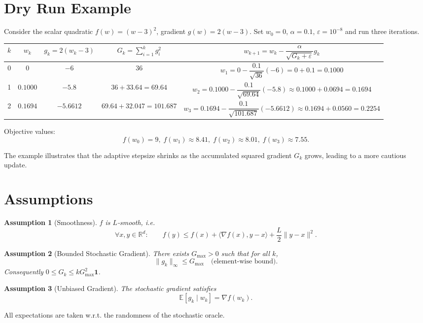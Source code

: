 \documentclass[11pt]{article}
\newtheorem{assumption}{Assumption}
\newcommand{\E}{\mathbb{E}}
\newcommand{\R}{\mathbb{R}}
\begin{document}
\section*{Dry Run Example}
Consider the scalar quadratic $f(w)=(w-3)^{2}$, gradient $g(w)=2(w-3)$.
Set $w_{0}=0$, $\alpha=0.1$, $\varepsilon=10^{-8}$ and run three iterations.

\begin{center}
\begin{tabular}{c|c|c|c|c}
$k$ & $w_{k}$ & $g_{k}=2(w_{k}-3)$ & $G_{k}=\sum_{i=1}^{k}g_{i}^{2}$ & $w_{k+1}=w_{k}-\dfrac{\alpha}{\sqrt{G_{k}+\varepsilon}}g_{k}$\\\hline
0 & $0$ & $-6$ & $36$ &
$w_{1}=0-\dfrac{0.1}{\sqrt{36}}(-6)=0+0.1=0.1000$\\[4pt]
1 & $0.1000$ & $-5.8$ & $36+33.64=69.64$ &
$w_{2}=0.1000-\dfrac{0.1}{\sqrt{69.64}}(-5.8)
          \approx0.1000+0.0694=0.1694$\\[4pt]
2 & $0.1694$ & $-5.6612$ &
$69.64+32.047=101.687$ &
$w_{3}=0.1694-\dfrac{0.1}{\sqrt{101.687}}(-5.6612)
          \approx0.1694+0.0560=0.2254$
\end{tabular}
\end{center}
Objective values:
\[
f(w_{0})=9,\; f(w_{1})\approx8.41,\; f(w_{2})\approx8.01,\; f(w_{3})\approx7.55.
\]

The example illustrates that the adaptive stepsize shrinks as the accumulated
squared gradient $G_{k}$ grows, leading to a more cautious update.

\section*{Assumptions}
\begin{assumption}[Smoothness]\label{ass:smooth}
$f$ is $L$‑smooth, i.e.
\[
\forall x,y\in\R^{d}:\qquad 
f(y)\le f(x)+\langle\nabla f(x),y-x\rangle+\frac{L}{2}\|y-x\|^{2}.
\]
\end{assumption}
\begin{assumption}[Bounded Stochastic Gradient]\label{ass:bound}
There exists $G_{\max}>0$ such that for all $k$,
\[
\|g_{k}\|_{\infty}\le G_{\max}\quad\text{(element‑wise bound).}
\]
Consequently $0\le G_{k}\le k G_{\max}^{2}\mathbf 1$.
\end{assumption}
\begin{assumption}[Unbiased Gradient]\label{ass:unbiased}
The stochastic gradient satisfies
\[
\E[g_{k}\mid w_{k}]=\nabla f(w_{k}) .
\]
\end{assumption}
All expectations are taken w.r.t. the randomness of the stochastic oracle.
\end{document}
